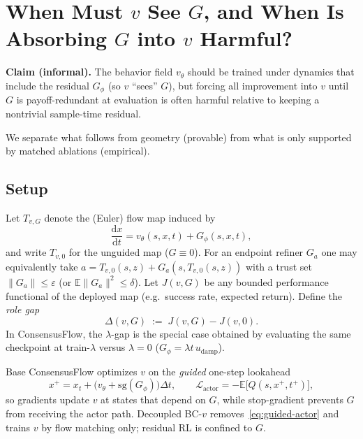 
\section{When Must $v$ See $G$, and When Is Absorbing $G$ into $v$ Harmful?}
\label{sec:vg-coupling}

\noindent\textbf{Claim (informal).}
The behavior field $v_\theta$ should be trained under dynamics that include the
residual $G_\phi$ (so $v$ ``sees'' $G$), but forcing all improvement into $v$ until
$G$ is payoff-redundant at evaluation is often harmful relative to keeping a
nontrivial sample-time residual.

\noindent We separate what follows from geometry (provable) from what is only
supported by matched ablations (empirical).

\subsection{Setup}
\label{subsec:vg-setup}

Let $T_{v,G}$ denote the (Euler) flow map induced by
\begin{equation}
  \frac{\mathrm{d}x}{\mathrm{d}t}=v_\theta(s,x,t)+G_\phi(s,x,t),
  \label{eq:vg-ode}
\end{equation}
and write $T_{v,0}$ for the unguided map ($G\equiv 0$).
For an endpoint refiner $G_a$ one may equivalently take
$a=T_{v,0}(s,z)+G_a(s,T_{v,0}(s,z))$ with a trust set
$\|G_a\|\le\varepsilon$ (or $\mathbb{E}\|G_a\|^2\le\delta$).
Let $J(v,G)$ be any bounded performance functional of the deployed map
(e.g.\ success rate, expected return).
Define the \emph{role gap}
\begin{equation}
  \Delta(v,G)\;:=\;J(v,G)-J(v,0).
  \label{eq:role-gap}
\end{equation}
In ConsensusFlow, the $\lambda$-gap is the special case obtained by evaluating
the same checkpoint at train-$\lambda$ versus $\lambda=0$
($G_\phi=\lambda t\,u_{\mathrm{damp}}$).

Base ConsensusFlow optimizes $v$ on the \emph{guided} one-step lookahead
\begin{equation}
  x^+=x_t+\bigl(v_\theta+\mathrm{sg}(G_\phi)\bigr)\Delta t,
  \qquad
  \mathcal{L}_{\mathrm{actor}}=-\mathbb{E}\bigl[Q(s,x^+,t^+)\bigr],
  \label{eq:guided-actor}
\end{equation}
so gradients update $v$ at states that depend on $G$, while stop-gradient
prevents $G$ from receiving the actor path.
Decoupled BC-$v$ removes~\eqref{eq:guided-actor} and trains $v$ by flow matching
only; residual RL is confined to $G$.

